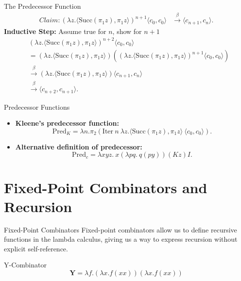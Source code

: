 \documentclass{beamer}
\begin{document}
\begin{frame}{The Predecessor Function}
  \begin{align*}Claim:
    (\lambda z. \langle \text{Succ}(\pi_1 z), \pi_1 z \rangle)^{n+1} \langle c_0, c_0 \rangle &\xrightarrow{\beta} \langle c_{n+1}, c_n \rangle.
  \end{align*}
  \textbf{Inductive Step:} Assume true for \(n\), show for \(n+1\)\\
  \[
  \begin{aligned}
    &(\lambda z. \langle \text{Succ}(\pi_1 z), \pi_1 z \rangle)^{n+2} \langle c_0, c_0 \rangle \\
    &= (\lambda z. \langle \text{Succ}(\pi_1 z), \pi_1 z \rangle)((\lambda z. \langle \text{Succ}(\pi_1 z), \pi_1 z \rangle)^{n+1} \langle c_0, c_0 \rangle) \\
    &\xrightarrow{\beta} (\lambda z. \langle \text{Succ}(\pi_1 z), \pi_1 z \rangle) \langle c_{n+1}, c_n \rangle \\
    &\xrightarrow{\beta} \langle c_{n+2}, c_{n+1} \rangle.
  \end{aligned}
  \]
\end{frame}
\begin{frame}{Predecessor Functions}
  \begin{itemize}
    \item \textbf{Kleene's predecessor function:}
      \[
      \text{Pred}_K = \lambda n. \pi_2 (\text{Iter} \ n \ \lambda z. \langle \text{Succ}(\pi_1 z), \pi_1 z \rangle \ \langle c_0, c_0 \rangle).
      \]
  
    \item \textbf{Alternative definition of predecessor:}
      \[
      \text{Pred}_c = \lambda x y z.\ x(\lambda p q.\ q(p y)) (K z) I.
      \]
  \end{itemize}
\end{frame}


\section{Fixed-Point Combinators and Recursion}
\begin{frame}{Fixed-Point Combinators}
  Fixed-point combinators allow us to define recursive functions in the lambda calculus, giving us a way to express recursion without explicit self-reference.
  \begin{block}{Y-Combinator}
    \[
    \mathbf{Y} = \lambda f. (\lambda x. f (x x)) (\lambda x. f (x x))
    \]
  \end{block}

\end{frame}
\end{document}
